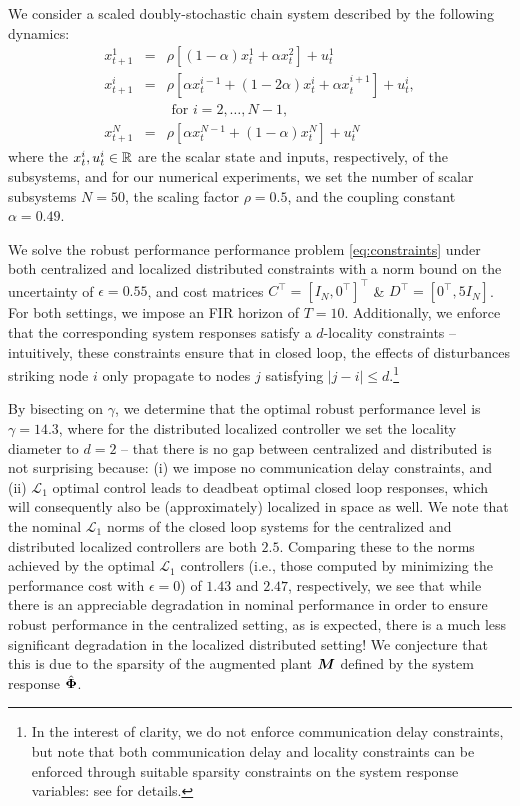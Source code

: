 We consider a scaled doubly-stochastic chain system described by the following dynamics:
\begin{equation}\label{eq:chain}
\begin{array}{rcl}
x^1_{t+1} &=& \rho\left[(1-\alpha)x^1_t + \alpha x^2_t\right] + u^1_t\\
x^i_{t+1} &=& \rho\left[\alpha x^{i-1}_t + (1-2\alpha)x^i_t + \alpha x^{i+1}_t\right] + u^i_t,\\
&& \text{ for $i=2,\dots,N-1$,} \\
 x^N_{t+1} &=& \rho\left[\alpha x^{N-1}_t + (1-\alpha)x^N_t\right] + u^N_t
 \end{array}
\end{equation}
where the $x^i_t, u^i_t \in \mathbb{R}$ are the scalar state and inputs, respectively, of the subsystems, and for our numerical experiments, we set the number of scalar subsystems $N=50$, the scaling factor $\rho = 0.5$, and the coupling constant $\alpha = 0.49$.  

We solve the robust performance performance problem \eqref{eq:constraints} under both centralized and localized distributed constraints with a norm bound on the uncertainty of $\epsilon = 0.55$, and cost matrices $C^\top = [I_N, 0^\top]^\top$ \& $D^\top = [0^\top, 5I_N]$.  For both settings, we impose an FIR horizon of $T=10$.  Additionally, we enforce that the corresponding system responses satisfy a $d$-locality constraints -- intuitively, these constraints ensure that in closed loop, the effects of disturbances striking node $i$ only propagate to nodes $j$ satisfying $|j-i|\leq d$.\footnote{In the interest of clarity, we do not enforce communication delay constraints, but note that both communication delay and locality constraints can be enforced through suitable sparsity constraints on the system response variables: see \cite{anderson2019system} for details.}

By bisecting on $\gamma$, we determine that the optimal robust performance level is $\gamma = 14.3$, where for the distributed localized controller we set the locality diameter to $d=2$ -- that there is no gap between centralized and distributed is not surprising because: (i) we impose no communication delay constraints, and (ii) $\mathcal{L}_1$ optimal control leads to deadbeat optimal closed loop responses, which will consequently also be (approximately) localized in space as well.  We note that the nominal $\mathcal{L}_1$ norms of the closed loop systems for the centralized and distributed localized controllers are both $2.5$.  Comparing these to the norms achieved by the optimal $\mathcal{L}_1$ controllers (i.e., those computed by minimizing the performance cost with $\epsilon = 0$) of $1.43$ and $2.47$, respectively, we see that while there is an appreciable degradation in nominal performance in order to ensure robust performance in the centralized setting, as is expected, there is a much less significant degradation in the localized distributed setting!  We conjecture that this is due to the sparsity of the augmented plant $\boldsymbol{M}$ defined by the system response $\hat{\boldsymbol{\Phi}}$. 

